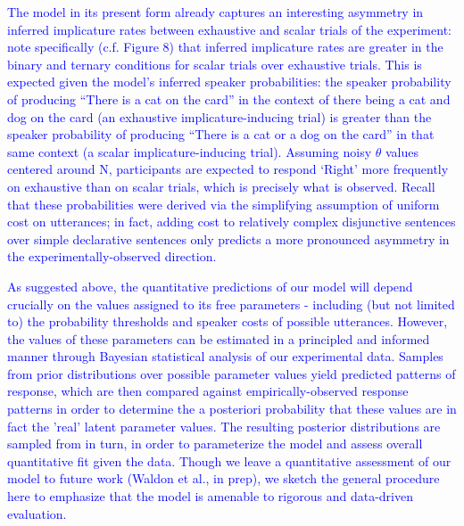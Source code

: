 \documentclass[man]{apa6}
\newcommand{\change}[1]{\textcolor{Blue}{#1}}
\theoremstyle{definition}
\theoremstyle{definition}
\theoremstyle{definition}
\theoremstyle{remark}
\begin{document}
\change{The model in its present form already captures an interesting asymmetry in inferred implicature rates between exhaustive and scalar trials of the experiment: note specifically (c.f. Figure 8) that inferred implicature rates are greater in the binary and ternary conditions for scalar trials over exhaustive trials. This is expected given the model's inferred speaker probabilities: the speaker probability of producing ``There is a cat on the card'' in the context of there being a cat and dog on the card (an exhaustive implicature-inducing trial) is greater than the speaker probability of producing ``There is a cat or a dog on the card'' in that same context (a scalar implicature-inducing trial). Assuming noisy  $\theta$ values centered around N, participants are expected to respond `Right' more frequently on exhaustive than on scalar trials, which is precisely what is observed. Recall that these probabilities were derived via the simplifying assumption of uniform cost on utterances; in fact, adding cost to relatively complex disjunctive sentences over simple declarative sentences only predicts a more pronounced asymmetry in the experimentally-observed direction.}



\change{As suggested above, the quantitative predictions of our model will depend crucially on the values assigned to its free parameters - including (but not limited to) the probability thresholds and speaker costs of possible utterances. However, the values of these parameters can be estimated in a principled and informed manner through Bayesian statistical analysis of our experimental data. Samples from prior distributions over possible parameter values yield predicted patterns of response, which are then compared against empirically-observed response patterns in order to determine the a posteriori probability that these values are in fact the 'real' latent parameter values. The resulting posterior distributions are sampled from in turn, in order to parameterize the model and assess overall quantitative fit given the data. Though we leave a quantitative assessment of our model to future work (Waldon et al., in prep), we sketch the general procedure here to emphasize that the model is amenable to rigorous and data-driven evaluation.}
\end{document}
